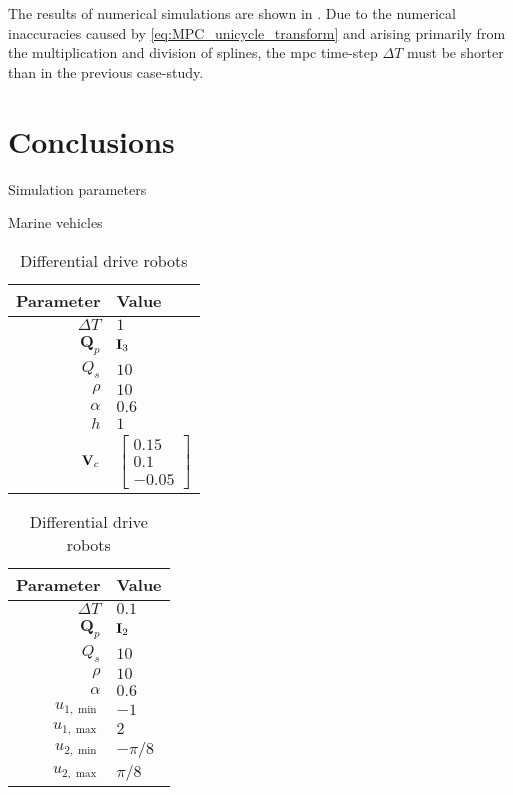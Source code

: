 The results of numerical simulations are shown in .
Due to the numerical inaccuracies caused by \eqref{eq:MPC_unicycle_transform} and arising primarily from the multiplication and division of splines, the \gls{mpc} time-step $\Delta T$ must be shorter than in the previous case-study.

\section{Conclusions}
\label{sec:MPC_conclusion}

\begin{table}[t]
    \begin{center}
    \captionsetup{width=.9\textwidth}
    \caption{Simulation parameters} \label{tab:handpos_MPC_params}
    \vspace*{-2mm}
    
    \begin{subtable}[t]{0.4\textwidth}
        \caption{Marine vehicles}
        \label{tab:MPC_AUV}
        
        \begin{tabular}[t]{r|l}
            {\bf Parameter} & {\bf Value} \\
            \hline
            $\Delta T$ & $1$ \\
            $\bm{Q}_p$ & $\mathbf{I}_3$ \\
            $Q_s$ & $10$ \\
            $\rho$ & $10$ \\
            $\alpha$ & $0.6$ \\
            $h$ & $1$ \\
            $\mathbf{V}_c$ & $\begin{bmatrix} 0.15 \\ 0.1 \\ -0.05 \end{bmatrix}$
        \end{tabular}
    \end{subtable}
    \begin{subtable}[t]{0.4\textwidth}
        \caption{Differential drive robots}
        \label{tab:MPC_unicycle}
        
        \begin{tabular}[t]{r|l}
            {\bf Parameter} & {\bf Value} \\
            \hline
            $\Delta T$ & $0.1$ \\
            $\bm{Q}_p$ & $\mathbf{I}_2$ \\
            $Q_s$ & $10$ \\
            $\rho$ & $10$ \\
            $\alpha$ & $0.6$ \\
            $u_{1, \min}$ & $-1$ \\
            $u_{1, \max}$ & $2$ \\
            $u_{2, \min}$ & $-\pi / 8$ \\
            $u_{2, \max}$ & $\pi / 8$
        \end{tabular}
    \end{subtable}
    \end{center}
\end{table}


